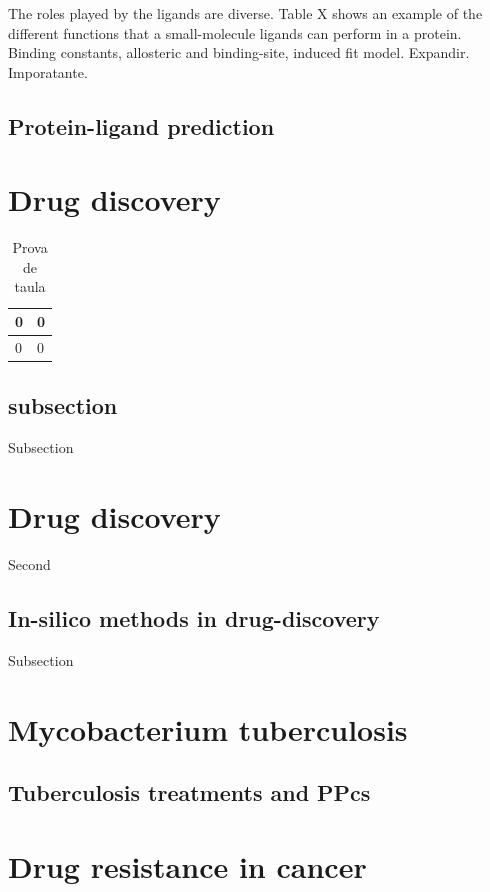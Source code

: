\documentclass[12pt, a4paper,twoside]{tesi_upf}
\begin{document}
\par The roles played by the ligands are diverse. Table X shows an example of the different functions that a small-molecule ligands can perform in a protein. 
Binding constants, allosteric and binding-site, induced fit model. Expandir. Imporatante. 

 




\subsection{Protein-ligand prediction}


\section{Drug discovery}



\begin{table}[h]
  \centering
  \begin{tabular}{|l|l|}
   \hline
    0 & 0 \\ \hline
    0 & 0 \\ \hline    
  \end{tabular}
  \caption{Prova de taula}

\end{table}

\subsection{subsection}
Subsection

\section{Drug discovery}
Second
\subsection{In-silico methods in drug-discovery}
Subsection
\section{Mycobacterium tuberculosis}
\subsection{Tuberculosis treatments and PPcs}
\section{Drug resistance in cancer}
\end{document}
